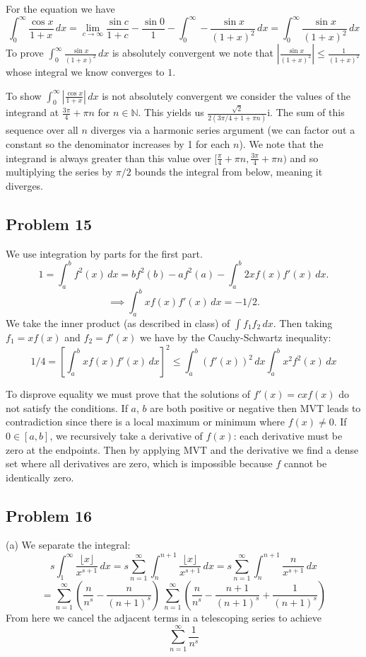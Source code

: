 \documentclass{amsart}
\begin{document}
\medskip \noindent For the equation we have \[\int_0^{\infty}\frac{\cos x}{1+x}\,dx=\lim_{c\to\infty}\frac{\sin c}{1+c}-\frac{\sin 0}{1}-\int_0^{\infty}-\frac{\sin x}{(1+x)^2}\,dx=\int_0^{\infty}\frac{\sin x}{(1+x)^2}\,dx\]
To prove $\int_0^\infty \frac{\sin x}{(1+x)^2}\,dx$ is absolutely convergent we note that $\left|\frac{\sin x}{(1+x)^2}\right|\leq \frac{1}{(1+x)^2}$ whose integral we know converges to $1$. 

\medskip \noindent To show $\int_0^\infty\left|\frac{\cos x}{1+x}\right|\,dx$ is not absolutely convergent we consider the values of the integrand at $\frac{3\pi}{4}+\pi n$ for $n\in \mathbb{N}$. This yields us $\frac{\sqrt{2}}{2(3\pi/4+1+\pi n)}$i. The sum of this sequence over all $n$ diverges via a harmonic series argument (we can factor out a constant so the denominator increases by 1 for each $n$). We note that the integrand is always greater than this value over $[\frac{\pi}{4}+\pi n, \frac{3\pi}{4}+\pi n)$ and so multiplying the series by $\pi/2$ bounds the integral from below, meaning it diverges.


\subsection*{Problem 15}
We use integration by parts for the first part. \[1=\int_a^bf^2(x)\,dx=bf^2(b)-af^2(a)-\int_a^b2xf(x)f'(x)\,dx.\]
\[\implies \int_a^bxf(x)f'(x)\,dx = -1/2.\]
We take the inner product (as described in class) of $\int f_1f_2\,dx$. Then taking $f_1=xf(x)$ and $f_2=f'(x)$ we have by the Cauchy-Schwartz inequality: \[1/4=\left[\int_a^bxf(x)f'(x)\,dx\right]^2\leq \int_a^b\left(f'(x)\right)^2\,dx\int_a^bx^2f^2(x)\,dx\]

To disprove equality we must prove that the solutions of $f'(x) = cxf(x)$ do not satisfy the conditions. If $a$, $b$ are both positive or negative then MVT leads to contradiction since there is a local maximum or minimum where $f(x)\neq 0$. If $0\in [a,b]$, we recursively take a derivative of $f(x)$: each derivative must be zero at the endpoints. Then by applying MVT and the derivative we find a dense set where all derivatives are zero, which is impossible because $f$ cannot be identically zero.

\subsection*{Problem 16}
(a) We separate the integral: \[s\int_1^{\infty}\frac{\lfloor x\rfloor}{x^{s+1}}\,dx=s\sum_{n=1}^{\infty}\int_n^{n+1}\frac{\lfloor x\rfloor}{x^{s+1}}\,dx = s\sum_{n=1}^{\infty}\int_n^{n+1}\frac{n}{x^{s+1}}\,dx \]
\[= \sum_{n=1}^{\infty}\left(\frac{n}{n^s}-\frac{n}{(n+1)^s}\right)\ \sum_{n=1}^{\infty}\left(\frac{n}{n^s}-\frac{n+1}{(n+1)^s}+\frac{1}{(n+1)^s}\right)\]
From here we cancel the adjacent terms in a telescoping series to achieve \[\sum_{n=1}^{\infty}\frac{1}{n^s}\]
\end{document}
